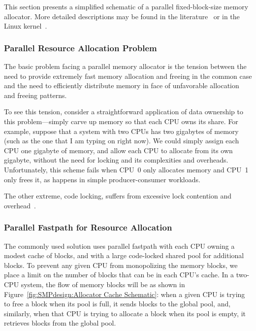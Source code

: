 This section presents a simplified schematic of a parallel fixed-block-size
memory allocator.
More detailed descriptions may be found in the
literature~\cite{McKenney92a,McKenney93,Bonwick01slab,McKenney01e}
or in the Linux kernel~\cite{Torvalds2.6kernel}.

\subsubsection{Parallel Resource Allocation Problem}

The basic problem facing a parallel memory allocator is the tension
between the need to provide extremely fast memory allocation and
freeing in the common case and the need to efficiently distribute
memory in face of unfavorable allocation and freeing patterns.

To see this tension, consider a straightforward application of
data ownership to this problem---simply carve up memory so that
each CPU owns its share.
For example, suppose that a system with two CPUs has two gigabytes
of memory (such as the one that I am typing on right now).
We could simply assign each CPU one gigabyte of memory, and allow each
CPU to allocate from its own gigabyte, without the need for locking and
its complexities and overheads.
Unfortunately, this scheme fails when CPU~0 only allocates memory and
CPU~1 only frees it, as happens in simple producer-consumer workloads.

The other extreme, code locking, suffers from excessive lock contention
and overhead~\cite{McKenney93}.

\subsubsection{Parallel Fastpath for Resource Allocation}
\label{sec:SMPdesign:Parallel Fastpath for Resource Allocation}

The commonly used solution uses parallel fastpath with each CPU
owning a modest cache of blocks, and with a large code-locked
shared pool for additional blocks.
To prevent any given CPU from monopolizing the memory blocks,
we place a limit on the number of blocks that can be in each CPU's
cache.
In a two-CPU system, the flow of memory blocks will be as shown
in Figure~\ref{fig:SMPdesign:Allocator Cache Schematic}:
when a given CPU is trying to free a block when its pool is full,
it sends blocks to the global pool, and, similarly, when that CPU
is trying to allocate a block when its pool is empty, it retrieves
blocks from the global pool.

